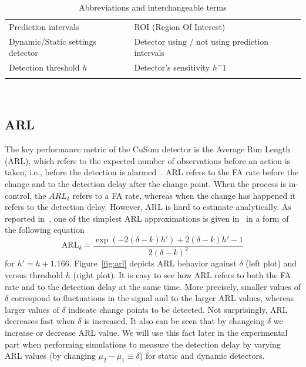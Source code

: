 \begin{table}[!htb]
	\begin{tabular}{| l | l |}
		\hline\noalign{\smallskip}
    Prediction intervals & ROI (Region Of Interest) \\
    Dynamic/Static settings detector & Detector using / not using prediction intervals \\
    Detection threshold $h$  & Detector's sensitivity $h^-1$ \\
		\noalign{\smallskip}\hline
	\end{tabular}
	\caption{Abbreviations and interchangeable terms}~\label{tab:interchangeable}
\end{table}

\subsection{ARL}
The key performance metric of the CuSum detector is the Average Run Length (ARL), which refers to the expected number of observations before an action is taken, i.e., before the detection is alarmed~\cite{Page1954}.
ARL refers to the FA rate before the change and to the detection delay after the change point.
When the process is in-control, the $ARL_{\delta}$ refers to a FA rate, whereas when the change has happened it refers to the detection delay.
However, ARL is hard to estimate analytically.
As reported in~\cite{plasse2021streaming}, one of the simplest ARL approximations is given in~\cite{siegmund2013sequential} in a form of the following equation 
\begin{equation}\label{eq:arl_approximation}
	\text{ARL}_{\delta} = \frac{\exp(-2(\delta-k)h') + 2(\delta - k)h' -1}{2 (\delta - k)^2}
\end{equation}
for $h' = h+1.166$.
Figure~\ref{fig:arl} depicts ARL behavior against $\delta$ (left plot) and versus threshold $h$ (right plot).
It is easy to see how ARL refers to both the FA rate and to the detection delay at the same time.
More precisely, smaller values of $\delta$ correspond to fluctuations in the signal and to the larger ARL values, whereas
larger values of $\delta$ indicate change points to be detected.
Not surprisingly, ARL decreases fast when $\delta$ is increased.
It also can be seen that by changeing $\delta$ we increase or decrease ARL value.
We will use this fact later in the experimental part when performing simulations to measure the detection delay by varying ARL values (by changing $\mu_2-\mu_1 \equiv \delta$) for static and dynamic detectors.
%
